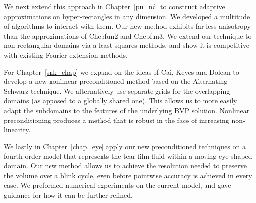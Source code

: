  We next extend this approach in Chapter~\ref{pu_nd} to construct adaptive approximations on hyper-rectangles in any dimension. We developed a multitude of algorithms to interact with them. Our new method exhibits far less anisotropy than the approximations of Chebfun2 and Chebfun3. We extend our technique to non-rectangular domains via a least squares methods, and show it is competitive with existing Fourier extension methods.
 
 For Chapter~\ref{snk_chap} we expand on the ideas of Cai, Keyes and Dolean to develop a new nonlinear preconditioned method based on the Alternating Schwarz technique. We alternatively use separate grids for the overlapping domains (as apposed to a globally shared one). This allows us to more easily adapt the subdomains to the features of the underlying BVP solution. Nonlinear preconditioning produces a method that is robust in the face of increasing non-linearity.
 
  We lastly in Chapter~\ref{chap_eye} apply our new preconditioned techniques on a fourth order model that represents the tear film fluid within a moving eye-shaped domain. Our new method allows us to achieve the resolution needed to preserve the volume over a blink cycle, even before pointwise accuracy is achieved in every case. We preformed numerical experiments on the current model, and gave guidance for how it can be further refined.

